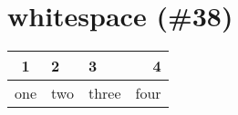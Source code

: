 \section{whitespace (\#38)}
\begin{longtable}[]{@{}cllr@{}}
\hline
1 & 2 & 3 & 4\tabularnewline
\hline
\endfirsthead
one & two & three & four\tabularnewline
\hline
\end{longtable}
